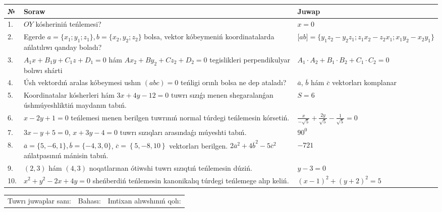 \documentclass{article}
\begin{document}
\begin{tabular}{|m{0.7cm}|m{10cm}|m{4cm}|}
\hline
№ & Soraw & Juwap \\
\hline
1. & $OY$ kósheriniń teńlemesi? & $x=0$ \\
\hline
2. & Egerde $a=\{ x_1; y_1; z_1\}, b=\{ x_2, y_2; z_2\}$ bolsa, vektor kóbeymeniń koordinatalarda ańlatılıwı qanday boladı? &  $\lbrack ab\rbrack=\{y_1z_2-y_2z_1; z_1x_2-z_2x_1; x_1y_2-x_2y_1\}$ \\
\hline
3. & $A_1x+B_1y+C_1z+D_1=0$ hám $Ax_2+By_2+Cz_2+D_2=0$ tegislikleri perpendikulyar bolıwı shárti & $A_1\cdot A_2+B_1\cdot B_2+C_1\cdot C_2=0$ \\
\hline
4. & Úsh vektordıń aralas kóbeymesi ushın $(abc)=0$ teńligi orınlı bolsa ne dep ataladı? & $\overline{a}$, $\overline{b}$ hám $\overline{c}$ vektorları komplanar \\
\hline
5. & Koordinatalar kósherleri hám $ 3x+4y-12=0 $ tuwrı sızıǵı menen shegaralanǵan úshmúyeshliktiń maydanın tabıń. & $ S=6 $ \\
\hline
6. & $x-2y+1=0$ teńlemesi menen berilgen tuwrınıń normal túrdegi teńlemesin kórsetiń. & $\frac{x}{- \sqrt{5}}+\frac{2y}{\sqrt{5}}-\frac{1}{\sqrt{5}}=0$ \\
\hline
7. & $3x-y+5=0$, $x+3y-4=0$ tuwrı sızıqları arasındaǵı múyeshti tabıń. & $90^{0}$ \\
\hline
8. & $\overline{a}=\{5,-6, 1 \}, \overline{b}=\{-4, 3, 0 \} $, $\overline{c}=\left\{ 5,-8, 10 \right\}$ vektorları berilgen. $2{\overline{a}}^{2}+4{\overline{b}}^{2}-5{\overline{c}}^{2}$ ańlatpasınıń mánisin tabıń. & $-721$ \\
\hline
9. & $(2, 3)$ hám $(4, 3)$ noqatlarınan ótiwshi tuwrı sızıqtıń teńlemesin dúziń. & $ y-3=0$ \\
\hline
10. & $x^{2}+y^{2}-2x+4y=0$ sheńberdiń teńlemesin kanonikalıq túrdegi teńlemege alıp keliń. & $(x-1)^{2}+(y+2)^{2}=5$ \\
\hline
\end{tabular}

\vspace{1cm}

\begin{tabular}{lll}
Tuwrı juwaplar sanı: \underline{\hspace{1.5cm}} & 
Bahası: \underline{\hspace{1.5cm}} & 
Imtixan alıwshınıń qolı: \underline{\hspace{2cm}} \\
\end{tabular}
\end{document}
